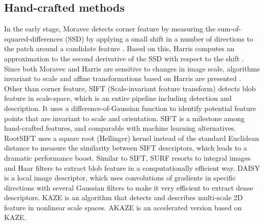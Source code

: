 \subsection{Hand-crafted methods}
In the early stage, Moravec detects corner feature by measuring the sum-of-squared-differences (SSD) by applying a small shift in a number of directions to the patch around a candidate feature \cite{moravec1980obstacle}. Based on this, Harris computes an approximation to the second derivative of the SSD with respect to the shift \cite{harris1988combined}. Since both Moravec and Harris are sensitive to changes in image scale, algorithms invariant to scale and affine transformations based on Harris are presented \cite{mikolajczyk2004scale}. Other than corner feature, SIFT (Scale-invariant feature transform) \cite{lowe2004distinctive} detects blob feature in scale-space, which is an entire pipeline including detection and description. It uses a difference-of-Gaussian function to identify potential feature points that are invariant to scale and orientation. SIFT is a milestone among hand-crafted features, and comparable with machine learning alternatives. RootSIFT \cite{arandjelovic2012three} uses a square root (Hellinger) kernel instead of the standard Euclidean distance to measure the similarity between SIFT descriptors, which leads to a dramatic performance boost. Similar to SIFT, SURF \cite{bay2006surf} resorts to integral images and Haar filters to extract blob feature in a computationally efficient way. DAISY \cite{tola2009daisy} is a local image descriptor, which uses convolutions of gradients in specific directions with several Gaussian filters to make it very efficient to extract dense descriptors. KAZE \cite{alcantarilla2012kaze} is an algorithm that detects and describes multi-scale 2D feature in nonlinear scale spaces. AKAZE \cite{Alcantarilla13bmvc} is an accelerated version based on KAZE.
